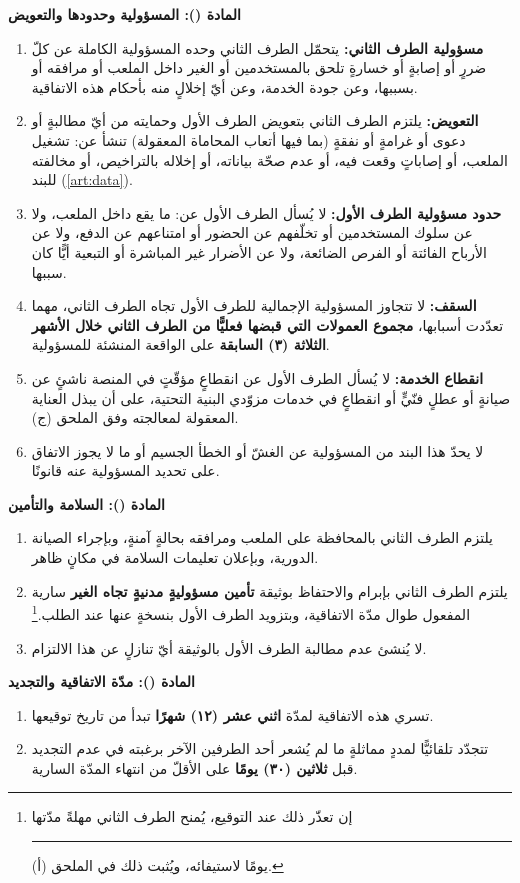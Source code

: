 \documentclass[12pt,a4paper]{article}
\newcounter{bndc}
\newcommand{\bnd}[1]{%
  \vspace{10pt}\par\noindent
  {\color{teal}\bfseries\large المادة (\arabic{bndc}): #1}%
  \stepcounter{bndc}%
  \par\vspace{2pt}\noindent{\color{rule}\rule{\linewidth}{0.6pt}}\par\vspace{4pt}%
}
\newcommand{\blank}[1][3.2cm]{\rule[-0.4ex]{#1}{0.5pt}}
\newcommand{\mlh}[1]{{\bfseries #1}}
\newenvironment{bnditems}
  {\begin{enumerate}[label=\arabic{bndc}.\arabic*,leftmargin=1.6em,itemsep=3pt,topsep=3pt]}
  {\end{enumerate}}
\begin{document}
\bnd{المسؤولية وحدودها والتعويض}\label{art:liab}
\begin{bnditems}
  \item \mlh{مسؤولية الطرف الثاني:} يتحمّل الطرف الثاني وحده المسؤولية الكاملة عن كلّ ضررٍ أو إصابةٍ أو خسارةٍ تلحق بالمستخدمين أو الغير داخل الملعب أو مرافقه أو بسببها، وعن جودة الخدمة، وعن أيّ إخلالٍ منه بأحكام هذه الاتفاقية.
  \item \mlh{التعويض:} يلتزم الطرف الثاني بتعويض الطرف الأول وحمايته من أيّ مطالبةٍ أو دعوى أو غرامةٍ أو نفقةٍ (بما فيها أتعاب المحاماة المعقولة) تنشأ عن: تشغيل الملعب، أو إصاباتٍ وقعت فيه، أو عدم صحّة بياناته، أو إخلاله بالتراخيص، أو مخالفته للبند (\ref{art:data}).
  \item \mlh{حدود مسؤولية الطرف الأول:} لا يُسأل الطرف الأول عن: ما يقع داخل الملعب، ولا عن سلوك المستخدمين أو تخلّفهم عن الحضور أو امتناعهم عن الدفع، ولا عن الأرباح الفائتة أو الفرص الضائعة، ولا عن الأضرار غير المباشرة أو التبعية أيًّا كان سببها.
  \item \mlh{السقف:} لا تتجاوز المسؤولية الإجمالية للطرف الأول تجاه الطرف الثاني، مهما تعدّدت أسبابها، \mlh{مجموع العمولات التي قبضها فعليًّا من الطرف الثاني خلال الأشهر الثلاثة (٣) السابقة} على الواقعة المنشئة للمسؤولية.
  \item \mlh{انقطاع الخدمة:} لا يُسأل الطرف الأول عن انقطاعٍ مؤقّتٍ في المنصة ناشئٍ عن صيانةٍ أو عطلٍ فنّيٍّ أو انقطاعٍ في خدمات مزوّدي البنية التحتية، على أن يبذل العناية المعقولة لمعالجته وفق الملحق (ج).
  \item لا يحدّ هذا البند من المسؤولية عن الغشّ أو الخطأ الجسيم أو ما لا يجوز الاتفاق على تحديد المسؤولية عنه قانونًا.
\end{bnditems}

\bnd{السلامة والتأمين}
\begin{bnditems}
  \item يلتزم الطرف الثاني بالمحافظة على الملعب ومرافقه بحالةٍ آمنةٍ، وبإجراء الصيانة الدورية، وبإعلان تعليمات السلامة في مكانٍ ظاهر.
  \item يلتزم الطرف الثاني بإبرام والاحتفاظ بوثيقة \mlh{تأمين مسؤوليةٍ مدنيةٍ تجاه الغير} سارية المفعول طوال مدّة الاتفاقية، وبتزويد الطرف الأول بنسخةٍ عنها عند الطلب.\footnote{إن تعذّر ذلك عند التوقيع، يُمنح الطرف الثاني مهلةً مدّتها \blank[1.4cm] يومًا لاستيفائه، ويُثبت ذلك في الملحق (أ).}
  \item لا يُنشئ عدم مطالبة الطرف الأول بالوثيقة أيّ تنازلٍ عن هذا الالتزام.
\end{bnditems}

\bnd{مدّة الاتفاقية والتجديد}
\begin{bnditems}
  \item تسري هذه الاتفاقية لمدّة \mlh{اثني عشر (١٢) شهرًا} تبدأ من تاريخ توقيعها.
  \item تتجدّد تلقائيًّا لمددٍ مماثلةٍ ما لم يُشعر أحد الطرفين الآخر برغبته في عدم التجديد قبل \mlh{ثلاثين (٣٠) يومًا} على الأقلّ من انتهاء المدّة السارية.
\end{bnditems}
\end{document}
